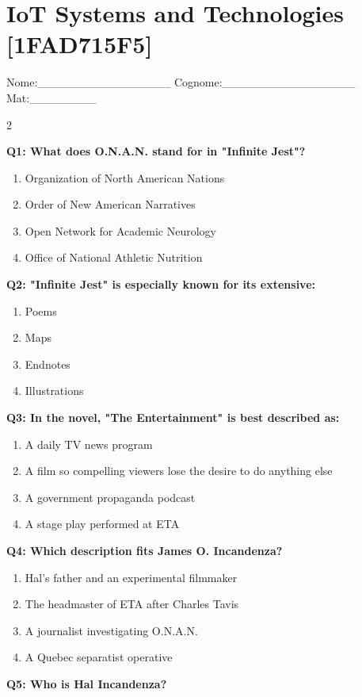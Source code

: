 \documentclass[10pt]{article}
\begin{document}
\section*{IoT Systems and Technologies \footnotesize [1FAD715F5]}
{\footnotesize Nome:\_\_\_\_\_\_\_\_\_\_\_\_\_\_\_\_ Cognome:\_\_\_\_\_\_\_\_\_\_\_\_\_\_\_\_ Mat:\_\_\_\_\_\_\_\_}
\begin{multicols}{2}

\textbf{Q1: What does O.N.A.N. stand for in "Infinite Jest"?}

\begin{enumerate}[label=\arabic*.]
\item Organization of North American Nations
\item Order of New American Narratives
\item Open Network for Academic Neurology
\item Office of National Athletic Nutrition
\end{enumerate}
\textbf{Q2: "Infinite Jest" is especially known for its extensive:}

\begin{enumerate}[label=\arabic*.]
\item Poems
\item Maps
\item Endnotes
\item Illustrations
\end{enumerate}
\textbf{Q3: In the novel, "The Entertainment" is best described as:}

\begin{enumerate}[label=\arabic*.]
\item A daily TV news program
\item A film so compelling viewers lose the desire to do anything else
\item A government propaganda podcast
\item A stage play performed at ETA
\end{enumerate}
\textbf{Q4: Which description fits James O. Incandenza?}

\begin{enumerate}[label=\arabic*.]
\item Hal's father and an experimental filmmaker
\item The headmaster of ETA after Charles Tavis
\item A journalist investigating O.N.A.N.
\item A Quebec separatist operative
\end{enumerate}
\textbf{Q5: Who is Hal Incandenza?}


\end{multicols}
\end{document}
